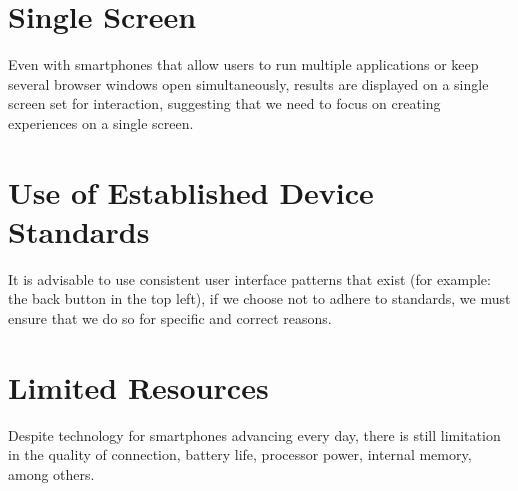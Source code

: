 \documentclass{article}
\begin{document}
\section{Single Screen}
Even with smartphones that allow users to run multiple applications or keep several browser windows open simultaneously, results are displayed on a single screen set for interaction, suggesting that we need to focus on creating experiences on a single screen.

\section{Use of Established Device Standards}
It is advisable to use consistent user interface patterns that exist (for example: the back button in the top left), if we choose not to adhere to standards, we must ensure that we do so for specific and correct reasons.

\section{Limited Resources}
Despite technology for smartphones advancing every day, there is still limitation in the quality of connection, battery life, processor power, internal memory, among others.
\end{document}

